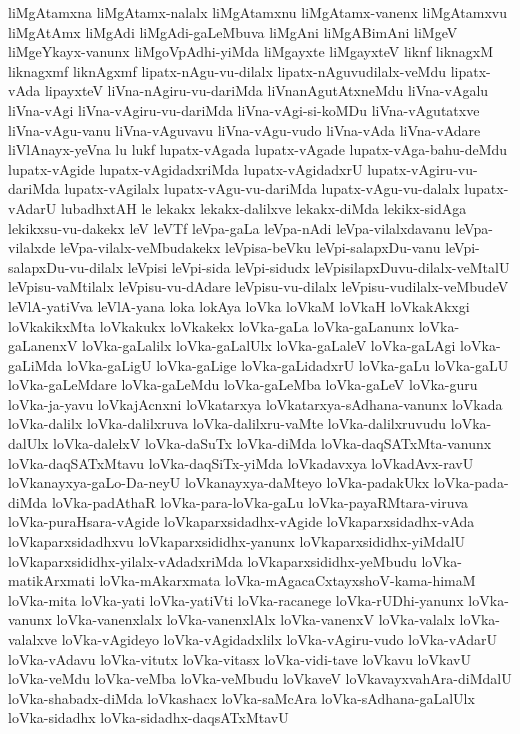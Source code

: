 {liMgAtamxna
liMgAtamx-nalalx
liMgAtamxnu
liMgAtamx-vanenx
liMgAtamxvu
liMgAtAmx
liMgAdi
liMgAdi-gaLeMbuva
liMgAni
liMgABimAni
liMgeV
liMgeYkayx-vanunx
liMgoVpAdhi-yiMda
liMgayxte
liMgayxteV
liknf
liknagxM
liknagxmf
liknAgxmf
lipatx-nAgu-vu-dilalx
lipatx-nAguvudilalx-veMdu
lipatx-vAda
lipayxteV
liVna-nAgiru-vu-dariMda
liVnanAgutAtxneMdu
liVna-vAgalu
liVna-vAgi
liVna-vAgiru-vu-dariMda
liVna-vAgi-si-koMDu
liVna-vAgutatxve
liVna-vAgu-vanu
liVna-vAguvavu
liVna-vAgu-vudo
liVna-vAda
liVna-vAdare
liVlAnayx-yeVna
lu
lukf
lupatx-vAgada
lupatx-vAgade
lupatx-vAga-bahu-deMdu
lupatx-vAgide
lupatx-vAgidadxriMda
lupatx-vAgidadxrU
lupatx-vAgiru-vu-dariMda
lupatx-vAgilalx
lupatx-vAgu-vu-dariMda
lupatx-vAgu-vu-dalalx
lupatx-vAdarU
lubadhxtAH
le
lekakx
lekakx-dalilxve
lekakx-diMda
lekikx-sidAga
lekikxsu-vu-dakekx
leV
leVTf
leVpa-gaLa
leVpa-nAdi
leVpa-vilalxdavanu
leVpa-vilalxde
leVpa-vilalx-veMbudakekx
leVpisa-beVku
leVpi-salapxDu-vanu
leVpi-salapxDu-vu-dilalx
leVpisi
leVpi-sida
leVpi-sidudx
leVpisilapxDuvu-dilalx-veMtalU
leVpisu-vaMtilalx
leVpisu-vu-dAdare
leVpisu-vu-dilalx
leVpisu-vudilalx-veMbudeV
leVlA-yatiVva
leVlA-yana
loka
lokAya
loVka
loVkaM
loVkaH
loVkakAkxgi
loVkakikxMta
loVkakukx
loVkakekx
loVka-gaLa
loVka-gaLanunx
loVka-gaLanenxV
loVka-gaLalilx
loVka-gaLalUlx
loVka-gaLaleV
loVka-gaLAgi
loVka-gaLiMda
loVka-gaLigU
loVka-gaLige
loVka-gaLidadxrU
loVka-gaLu
loVka-gaLU
loVka-gaLeMdare
loVka-gaLeMdu
loVka-gaLeMba
loVka-gaLeV
loVka-guru
loVka-ja-yavu
loVkajAcnxni
loVkatarxya
loVkatarxya-sAdhana-vanunx
loVkada
loVka-dalilx
loVka-dalilxruva
loVka-dalilxru-vaMte
loVka-dalilxruvudu
loVka-dalUlx
loVka-dalelxV
loVka-daSuTx
loVka-diMda
loVka-daqSATxMta-vanunx
loVka-daqSATxMtavu
loVka-daqSiTx-yiMda
loVkadavxya
loVkadAvx-ravU
loVkanayxya-gaLo-Da-neyU
loVkanayxya-daMteyo
loVka-padakUkx
loVka-pada-diMda
loVka-padAthaR
loVka-para-loVka-gaLu
loVka-payaRMtara-viruva
loVka-puraHsara-vAgide
loVkaparxsidadhx-vAgide
loVkaparxsidadhx-vAda
loVkaparxsidadhxvu
loVkaparxsididhx-yanunx
loVkaparxsididhx-yiMdalU
loVkaparxsididhx-yilalx-vAdadxriMda
loVkaparxsididhx-yeMbudu
loVka-matikArxmati
loVka-mAkarxmata
loVka-mAgacaCxtayxshoV-kama-himaM
loVka-mita
loVka-yati
loVka-yatiVti
loVka-racanege
loVka-rUDhi-yanunx
loVka-vanunx
loVka-vanenxlalx
loVka-vanenxlAlx
loVka-vanenxV
loVka-valalx
loVka-valalxve
loVka-vAgideyo
loVka-vAgidadxlilx
loVka-vAgiru-vudo
loVka-vAdarU
loVka-vAdavu
loVka-vitutx
loVka-vitasx
loVka-vidi-tave
loVkavu
loVkavU
loVka-veMdu
loVka-veMba
loVka-veMbudu
loVkaveV
loVkavayxvahAra-diMdalU
loVka-shabadx-diMda
loVkashacx
loVka-saMcAra
loVka-sAdhana-gaLalUlx
loVka-sidadhx
loVka-sidadhx-daqsATxMtavU
}
